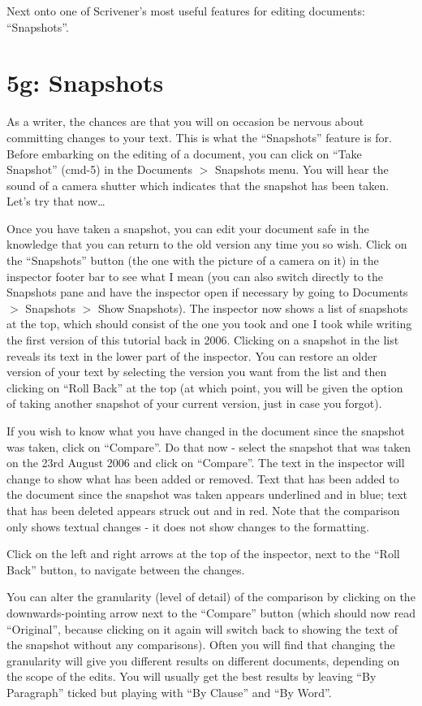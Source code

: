 \documentclass[10pt,oneside]{memoir}
\begin{document}
Next onto one of Scrivener's most useful features for editing documents: ``Snapshots''.


\pagebreak \section{5g: Snapshots}
\label{g:snapshots}

As a writer, the chances are that you will on occasion be nervous about committing changes to your text. This is what the ``Snapshots'' feature is for. Before embarking on the editing of a document, you can click on ``Take Snapshot'' (cmd-5) in the Documents $>$ Snapshots menu. You will hear the sound of a camera shutter which indicates that the snapshot has been taken. Let's try that now{\ldots}


Once you have taken a snapshot, you can edit your document safe in the knowledge that you can return to the old version any time you so wish. Click on the ``Snapshots'' button (the one with the picture of a camera on it) in the inspector footer bar to see what I mean (you can also switch directly to the Snapshots pane and have the inspector open if necessary by going to Documents $>$ Snapshots $>$ Show Snapshots). The inspector now shows a list of snapshots at the top, which should consist of the one you took and one I took while writing the first version of this tutorial back in 2006. Clicking on a snapshot in the list reveals its text in the lower part of the inspector. You can restore an older version of your text by selecting the version you want from the list and then clicking on ``Roll Back'' at the top (at which point, you will be given the option of taking another snapshot of your current version, just in case you forgot).


If you wish to know what you have changed in the document since the snapshot was taken, click on ``Compare''. Do that now - select the snapshot that was taken on the 23rd August 2006 and click on ``Compare''. The text in the inspector will change to show what has been added or removed. Text that has been added to the document since the snapshot was taken appears underlined and in blue; text that has been deleted appears struck out and in red. Note that the comparison only shows textual changes - it does not show changes to the formatting.


Click on the left and right arrows at the top of the inspector, next to the ``Roll Back'' button, to navigate between the changes.


You can alter the granularity (level of detail) of the comparison by clicking on the downwards-pointing arrow next to the ``Compare'' button (which should now read ``Original'', because clicking on it again will switch back to showing the text of the snapshot without any comparisons). Often you will find that changing the granularity will give you different results on different documents, depending on the scope of the edits. You will usually get the best results by leaving ``By Paragraph'' ticked but playing with ``By Clause'' and ``By Word''.
\end{document}

